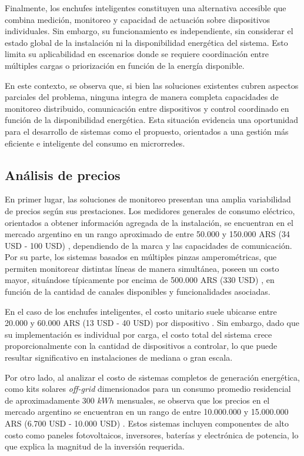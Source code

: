 Finalmente, los enchufes inteligentes constituyen una alternativa accesible que combina medición, monitoreo y capacidad de actuación sobre dispositivos individuales. Sin embargo, su funcionamiento es independiente, sin considerar el estado global de la instalación ni la disponibilidad energética del sistema. Esto limita su aplicabilidad en escenarios donde se requiere coordinación entre múltiples cargas o priorización en función de la energía disponible.

En este contexto, se observa que, si bien las soluciones existentes cubren aspectos parciales del problema, ninguna integra de manera completa capacidades de monitoreo distribuido, comunicación entre dispositivos y control coordinado en función de la disponibilidad energética. Esta situación evidencia una oportunidad para el desarrollo de sistemas como el propuesto, orientados a una gestión más eficiente e inteligente del consumo en microrredes.

\subsection{Análisis de precios}

En primer lugar, las soluciones de monitoreo presentan una amplia variabilidad de precios según sus prestaciones. Los medidores generales de consumo eléctrico, orientados a obtener información agregada de la instalación, se encuentran en el mercado argentino en un rango aproximado de entre 50.000 y 150.000 ARS (34 USD - 100 USD) \cite{ml_medidor_consumo_wifi}, dependiendo de la marca y las capacidades de comunicación. Por su parte, los sistemas basados en múltiples pinzas amperométricas, que permiten monitorear distintas líneas de manera simultánea, poseen un costo mayor, situándose típicamente por encima de 500.000 ARS (330 USD) \cite{ml_emporia_vue3}, en función de la cantidad de canales disponibles y funcionalidades asociadas.

En el caso de los enchufes inteligentes, el costo unitario suele ubicarse entre 20.000 y 60.000 ARS (13 USD - 40 USD) por dispositivo \cite{ml_enchufe_wifi}. Sin embargo, dado que su implementación es individual por carga, el costo total del sistema crece proporcionalmente con la cantidad de dispositivos a controlar, lo que puede resultar significativo en instalaciones de mediana o gran escala.

Por otro lado, al analizar el costo de sistemas completos de generación energética, como kits solares \textit{off-grid} dimensionados para un consumo promedio residencial de aproximadamente 300 $kWh$ mensuales, se observa que los precios en el mercado argentino se encuentran en un rango de entre 10.000.000 y 15.000.000 ARS (6.700 USD - 10.000 USD) \cite{ml_kit_solar_offgrid}. Estos sistemas incluyen componentes de alto costo como paneles fotovoltaicos, inversores, baterías y electrónica de potencia, lo que explica la magnitud de la inversión requerida.

